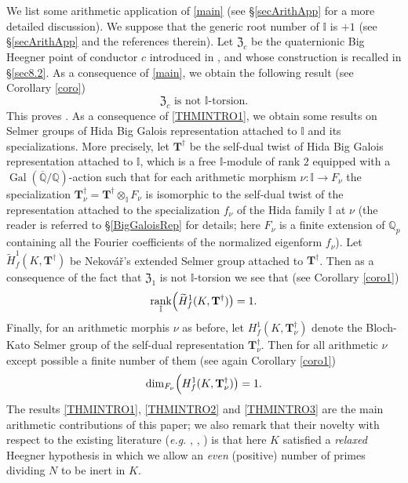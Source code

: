 \documentclass[a4paper,11pt]{amsart}
\numberwithin{equation}{section}
\theoremstyle{plain}
\theoremstyle{definition}
\theoremstyle{remark}
\newcommand{\Q}{\mathbb Q}
\newcommand{\I}{\mathbb{I}}
\DeclareMathOperator{\Gal}{Gal}
\DeclareMathOperator{\rank}{rank}
\begin{document}
We list some arithmetic application of \eqref{main} (see \S\ref{secArithApp} for a more detailed discussion). We suppose that the generic root number of $\I$ is $+1$ 
(see \S\ref{secArithApp} and the references therein).  
Let $\mathfrak{Z}_c$ be the quaternionic Big Heegner point of conductor $c$ introduced in \cite{LV-MM}, and whose construction is recalled in \S\ref{sec8.2}. As a consequence 
of \eqref{main}, we obtain the following result (see Corollary \ref{coro})
\begin{equation}\label{THMINTRO1}
\text{$\mathfrak{Z}_c$ is not $\I$-torsion}.\end{equation}
This proves \cite[Conjecture 10.3]{LV-MM}. As a consequence of \eqref{THMINTRO1}, we obtain 
some results on Selmer groups of Hida Big Galois representation attached to $\I$ and its specializations. 
More precisely, let $\mathbf{T}^\dagger$ be the self-dual twist of Hida Big Galois representation 
attached to $\I$, which is a free $\I$-module of rank $2$ equipped with a $\Gal(\overline{\Q}/\Q)$-action such that for each arithmetic morphism $\nu:\I\rightarrow F_\nu$ the specialization $\mathbf{T}^\dagger_\nu=\mathbf{T}^\dagger\otimes_{\I}F_\nu$ is isomorphic to the self-dual twist of the representation attached to the specialization $f_\nu$ of the Hida family $\I$ at $\nu$
(the reader is referred to \S\ref{BigGaloisRep} for details; here $F_\nu$ is a finite extension of $\Q_p$ containing all the Fourier coefficients of the normalized eigenform $f_\nu$). 
Let $\widetilde{H}^1_f(K,\mathbf{T}^\dagger)$ be Nekov\'{a}\v{r}'s extended Selmer group attached to $\mathbf{T}^\dagger$. Then as a consequence of the fact that $\mathfrak{Z}_1$ is not $\I$-torsion we see that 
(see Corollary \ref{coro1}) 
\begin{equation}\label{THMINTRO2}
\rank_\I\Bigl(\widetilde{H}^1_f(K,\mathbf{T}^\dagger)\bigr)=1.\end{equation}
Finally, for an arithmetic morphis $\nu$ as before, let $H^1_f(K,\mathbf{T}_\nu^\dagger)$ denote 
the Bloch-Kato Selmer group of the self-dual representation $\mathbf{T}_\nu^\dagger$. Then  
for all arithmetic $\nu$ except possible a finite number of them
(see again Corollary \ref{coro1})
\begin{equation}\label{THMINTRO3}
\dim_{F_\nu}\Bigl(H^1_f(K,\mathbf{T}^\dagger_\nu)\bigr)=1.\end{equation}
The results \eqref{THMINTRO1}, \eqref{THMINTRO2} and \eqref{THMINTRO3} are 
the main arithmetic contributions of this paper; we also remark that their novelty with respect to 
the existing literature (\emph{e.g.} \cite{Castella}, \cite{JLZ}, \cite{BL-Coleman}) is that here $K$ satisfied a \emph{relaxed} Heegner hypothesis
in which we allow an \emph{even} (positive) number of primes dividing $N$ to be inert in $K$. 
\end{document}
